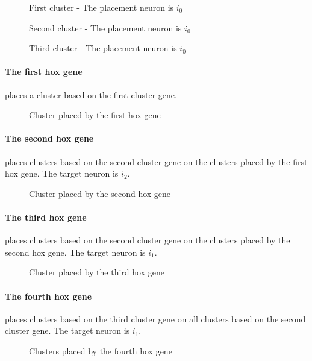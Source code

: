 \begin{figure}[H]
    \centering
    
    \caption{First cluster - The placement neuron is $i_0$}
\end{figure}
\begin{figure}[H]
    \centering
    
    \caption{Second cluster - The placement neuron is $i_0$}
\end{figure}
\begin{figure}[H]
    \centering
    
    \caption{Third cluster - The placement neuron is $i_0$}
\end{figure}

\paragraph{The first hox gene} places a cluster based on the first cluster gene.
\FloatBarrier
\begin{figure}[H]
    \centering
    
    \caption{Cluster placed by the first hox gene}
\end{figure}
\FloatBarrier

\newpage

\paragraph{The second hox gene} places clusters based on the second cluster gene on the clusters placed by the first hox gene.
The target neuron is $i_2$.
\begin{figure}[H]
    \centering
    
    \caption{Cluster placed by the second hox gene}
\end{figure}

\paragraph{The third hox gene} places clusters based on the second cluster gene on the clusters placed by the second hox gene.
The target neuron is $i_1$.
\begin{figure}[H]
    \centering
    
    \caption{Cluster placed by the third hox gene}
\end{figure}

\paragraph{The fourth hox gene} places clusters based on the third cluster gene on all clusters based on the second cluster gene.
The target neuron is $i_1$.
\begin{figure}[H]
    \centering
    
    \caption{Clusters placed by the fourth hox gene}
\end{figure}
